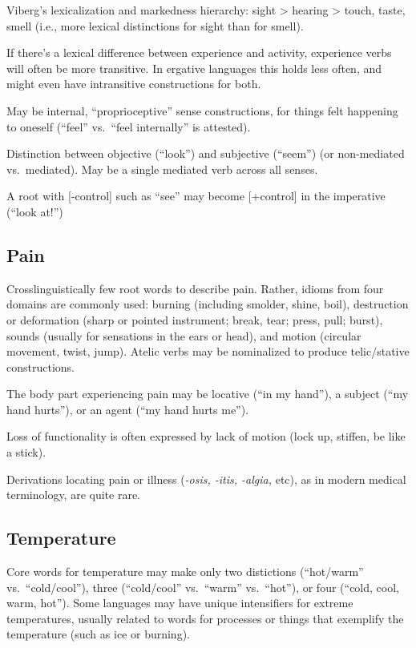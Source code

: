 \documentclass[11pt]{article}
\begin{document}
Viberg's lexicalization and markedness hierarchy: sight > hearing >
touch, taste, smell (i.e., more lexical distinctions for sight than
for smell).

If there's a lexical difference between experience and activity,
experience verbs will often be more transitive.  In ergative
languages this holds less often, and might even have intransitive
constructions for both.

May be internal, ``proprioceptive'' sense constructions, for things
felt happening to oneself (``feel'' vs.\ ``feel internally'' is
attested). 

Distinction between objective (``look'') and subjective (``seem'') (or
non-mediated vs.\ mediated).  May be a single mediated verb across all
senses.

A root with [-control] such as ``see'' may become [+control] in the
imperative (``look at!'')


\subsection{Pain}
Crosslinguistically few root words to describe pain.  Rather, idioms
from four domains are commonly used: burning (including smolder,
shine, boil), destruction or deformation (sharp or pointed instrument;
break, tear; press, pull; burst), sounds (usually for sensations in
the ears or head), and motion (circular movement, twist, jump).
Atelic verbs may be nominalized to produce telic/stative
constructions.

The body part experiencing pain may be locative (``in my hand''), a
subject (``my hand hurts''), or an agent (``my hand hurts me'').

Loss of functionality is often expressed by lack of motion (lock up,
stiffen, be like a stick).

Derivations locating pain or illness (\textit{-osis, -itis, -algia,}
etc), as in modern medical terminology, are quite rare.

\subsection{Temperature}
Core words for temperature may make only two distictions (``hot/warm''
vs.\ ``cold/cool''), three (``cold/cool'' vs.\ ``warm'' vs.\ ``hot''),
or four (``cold, cool, warm, hot''). Some languages may have unique
intensifiers for extreme temperatures, usually related to words for
processes or things that exemplify the temperature (such as ice or
burning).
\end{document}

